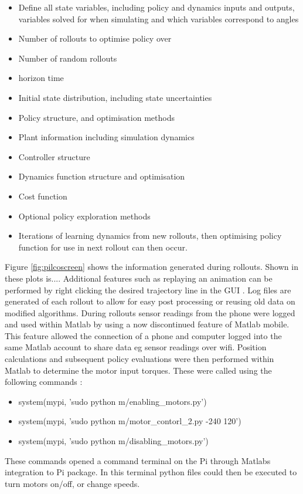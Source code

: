 \documentclass[twoside,twocolumn,12pt]{article}
\begin{document}
\begin{itemize}
\item Define all state variables, including policy and dynamics inputs and outputs, variables solved for when simulating and which variables correspond to angles
\item Number of rollouts to optimise policy over 
\item Number of random rollouts
\item horizon time
\item Initial state distribution, including state uncertainties
\item Policy structure, and optimisation methods
\item Plant information including simulation dynamics
\item Controller structure
\item Dynamics function structure and optimisation
\item Cost function
\item Optional policy exploration methods
\item Iterations of learning dynamics from new rollouts, then optimising policy function for use in next rollout can then occur.
\end{itemize}



Figure \ref{fig:pilcoscreen} shows the information generated during rollouts. Shown in these plots is.... Additional features such as replaying an animation can be performed by right clicking the desired trajectory line in the GUI \cite{eric}. 
Log files are generated of each rollout to allow for easy post processing or reusing old data on modified algorithms.
\newline
During rollouts sensor readings from the phone were logged and used within Matlab by using a now discontinued feature of Matlab mobile. This feature allowed the connection of a phone and computer logged into the same Matlab account to share data eg sensor readings over wifi.
\newline
Position calculations and subsequent policy evaluations were then performed within Matlab to determine the motor input torques. These were called using the following commands \cite{arsalan}: 
\begin{itemize}
\item system(mypi, 'sudo python m/enabling\_motors.py')
\item system(mypi, 'sudo python m/motor\_contorl\_2.py -240 120')
\item system(mypi, 'sudo python m/disabling\_motors.py')
\end{itemize}
These commands opened a command terminal on the Pi through Matlabs integration to Pi package. In this terminal python files could then be executed to turn motors on/off, or change speeds.
\end{document}
